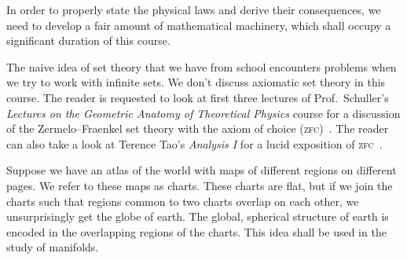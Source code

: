 \documentclass[a4 paper, oneside, 12pt]{book}
\theoremstyle{definition}
\begin{document}
	In order to properly state the physical laws and derive their consequences, we need to develop a fair amount of mathematical machinery, which shall occupy a significant duration of this course.

	The naive idea of set theory that we have from school encounters problems when we try to work with infinite sets. We don't discuss axiomatic set theory in this course. The reader is requested to look at first three lectures of Prof.\ Schuller's \textit{Lectures on the Geometric Anatomy of Theoretical Physics} course for a discussion of the Zermelo--Fraenkel set theory with the axiom of choice (\textsc{zfc})~\cite{Schuller_geometric_videos}. The reader can also take a look at Terence Tao's \textit{Analysis I} for a lucid exposition of \textsc{zfc}~\cite{Tao}.

	Suppose we have an atlas of the world with maps of different regions on different pages. We refer to these maps as charts. These charts are flat, but if we join the charts such that regions common to two charts overlap on each other, we unsurprisingly get the globe of earth. The global, spherical structure of earth is encoded in the overlapping regions of the charts. This idea shall be used in the study of manifolds.
\end{document}
